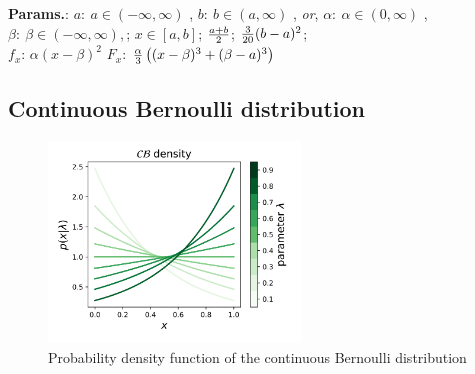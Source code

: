     {\color{darkblue} \textbf{Params.}:} {$a:~a \in (-\infty,\infty)$ ,  $b:~b \in (a, \infty)$ , \textit{or},  $\alpha:~\alpha\in (0,\infty)$ ,  $\beta:~\beta \in (-\infty,\infty),$}; {$x\in [a , b]\!$}; {${a+b \over 2}$}; {$ {3 \over 20} (b-a)^2 $};\hspace{0.5cm}\\{\color{darkblue} \textbf{$f_x$}:} {$\alpha \left ( x - \beta \right )^2 $}{\color{darkblue} \textbf{$F_x$}:} {${\alpha \over 3} \left ( (x - \beta)^3 + (\beta - a)^3 \right )$}



    
        
\subsection{Continuous Bernoulli distribution}


    \begin{figure}[H]
        \centering
        \includegraphics[width=0.6\textwidth]{images/CB pdf.png}
        \caption{Probability density function of the continuous Bernoulli distribution}
    \end{figure}




